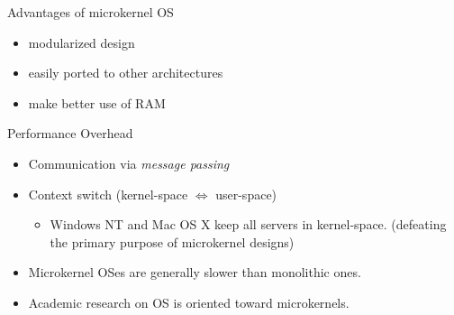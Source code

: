 \begin{frame}
  \begin{exampleblock}{Advantages of microkernel OS}
    \begin{itemize}
    \item modularized design
    \item easily ported to other architectures
    \item make better use of RAM
    \end{itemize}
  \end{exampleblock}
  \begin{exampleblock}{Performance Overhead}
    \begin{itemize}
    \item Communication via \emph{message passing}
    \item Context switch (kernel-space $\Leftrightarrow$ user-space)
      \begin{itemize}
      \item Windows NT and Mac OS X keep all servers in kernel-space. (defeating the
        primary purpose of microkernel designs)
      \end{itemize}
    \end{itemize}
  \end{exampleblock}
  \begin{itemize}
  \item Microkernel OSes are generally slower than monolithic ones.
  \item Academic research on OS is oriented toward microkernels.
  \end{itemize}
\end{frame}

